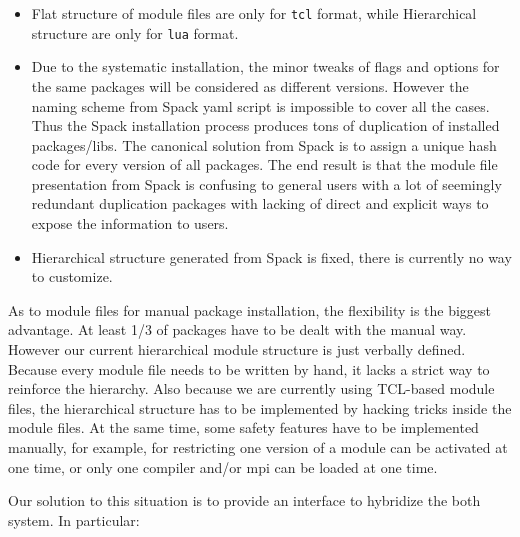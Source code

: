 \documentclass[conference]{IEEEtran}
\begin{document}
\begin{itemize}
    \item Flat structure of module files are only for \texttt{tcl} format, while Hierarchical structure are only for \texttt{lua} format.
    \item Due to the systematic installation, the minor tweaks of flags and options for the same packages will be considered as different versions. However the naming scheme from Spack yaml script is impossible to cover all the cases. Thus the Spack installation process produces tons of duplication of installed packages/libs. The canonical solution from Spack is to assign a unique hash code for every version of all packages. The end result is that the module file presentation from Spack is confusing to general users with a lot of seemingly redundant duplication packages with lacking of direct and explicit ways to expose the information to users.
    \item Hierarchical structure generated from Spack is fixed, there is currently no way to customize.
\end{itemize}

As to module files for manual package installation, the flexibility is the biggest advantage. At least 1/3 of packages have to be dealt with the manual way. However our current hierarchical module structure is just verbally defined. Because every module file needs to be written by hand, it lacks a strict way to reinforce the hierarchy. Also because we are currently using TCL-based module files, the hierarchical structure has to be implemented by hacking tricks inside the module files. At the same time, some safety features have to be implemented manually, for example, for restricting one version of a module can be activated at one time, or only one compiler and/or mpi can be loaded at one time.

Our solution to this situation is to provide an interface to hybridize the both system. In particular:
\end{document}
